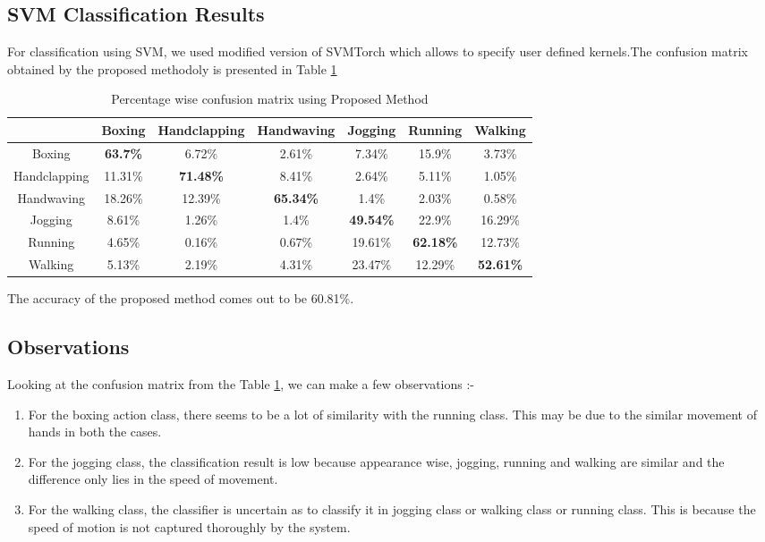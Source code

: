 \subsection{SVM Classification Results}
For classification using SVM, we used modified version of SVMTorch which allows to specify user defined kernels.The confusion matrix obtained by the proposed methodoly is presented in Table \ref{proposed_CM}
\begin{table}[!htbp]
\centering
\begin{tabular}{|c|c|c|c|c|c|c|}
\hline
 &Boxing&Handclapping&Handwaving&Jogging&Running&Walking\\
 \hline
Boxing&\textbf{63.7\%}&6.72\%&2.61\%&7.34\%&15.9\%&3.73\%\\
Handclapping&11.31\%&\textbf{71.48\%}&8.41\%&2.64\%&5.11\%&1.05\%\\
Handwaving&18.26\%&12.39\%&\textbf{65.34\%}&1.4\%&2.03\%&0.58\%\\
Jogging&8.61\%&1.26\%&1.4\%&\textbf{49.54\%}&22.9\%&16.29\%\\
Running&4.65\%&0.16\%&0.67\%&19.61\%&\textbf{62.18\%}&12.73\%\\
Walking&5.13\%&2.19\%&4.31\%&23.47\%&12.29\%&\textbf{52.61\%}\\
\hline
\end{tabular}
\caption{Percentage wise confusion matrix using Proposed Method}
\label{proposed_CM}
\end{table}

The accuracy of the proposed method comes out to be 60.81\%.

\subsection{Observations}
Looking at the confusion matrix from the Table \ref{proposed_CM}, we can make a few observations :-
\begin{enumerate}
\item For the boxing action class, there seems to be a lot of similarity with the running class. This may be due to the similar movement of hands in both the cases.
\item For the jogging class, the classification result is low because appearance wise, jogging, running and walking are similar and the difference only lies in the speed of movement.
\item For the walking class, the classifier is uncertain as to classify it in jogging class or walking class or running class. This is because the speed of motion is not captured thoroughly by the system.
\end{enumerate}

